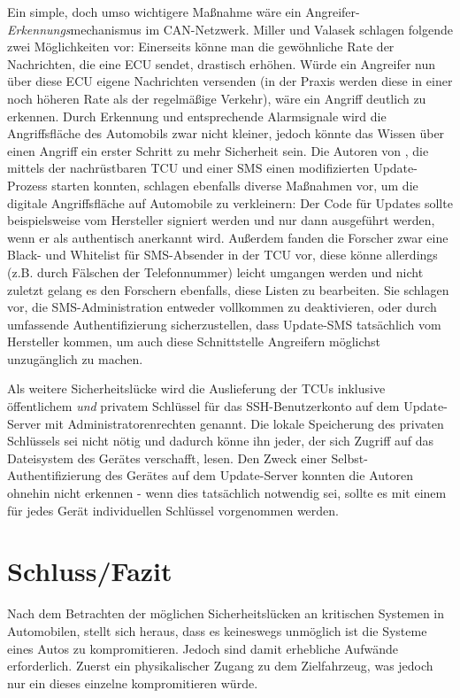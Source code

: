 \documentclass[
    fontsize=12pt,
    headings=small,
    parskip=half,           %
    bibliography=totoc,9
    numbers=noenddot,       %
    open=any,               %
    ]{scrreprt}
\begin{document}
Ein simple, doch umso wichtigere Maßnahme wäre ein Angreifer-\textit{Erkennungs}mechanismus im CAN-Netzwerk. Miller und Valasek schlagen folgende zwei Möglichkeiten vor: Einerseits könne man die gewöhnliche Rate der Nachrichten, die eine ECU sendet, drastisch erhöhen. Würde ein Angreifer nun über diese ECU eigene Nachrichten versenden (in der Praxis werden diese in einer noch höheren Rate als der regelmäßige Verkehr), wäre ein Angriff deutlich zu erkennen. Durch Erkennung und entsprechende Alarmsignale wird die Angriffsfläche des Automobils zwar nicht kleiner, jedoch könnte das Wissen über einen Angriff ein erster Schritt zu mehr Sicherheit sein.
Die Autoren von \cite{FPK15}, die mittels der nachrüstbaren TCU und einer SMS einen modifizierten Update-Prozess starten konnten, schlagen ebenfalls diverse Maßnahmen vor, um die digitale Angriffsfläche auf Automobile zu verkleinern: Der Code für Updates sollte beispielsweise vom Hersteller signiert werden und nur dann ausgeführt werden, wenn er als authentisch anerkannt wird. Außerdem fanden die Forscher zwar eine Black- und Whitelist für SMS-Absender in der TCU vor, diese könne allerdings (z.B. durch Fälschen der Telefonnummer) leicht umgangen werden und nicht zuletzt gelang es den Forschern ebenfalls, diese Listen zu bearbeiten. Sie schlagen vor, die SMS-Administration entweder vollkommen zu deaktivieren, oder durch umfassende Authentifizierung sicherzustellen, dass Update-SMS tatsächlich vom Hersteller kommen, um auch diese Schnittstelle Angreifern möglichst unzugänglich zu machen.\par
Als weitere Sicherheitslücke wird die Auslieferung der TCUs inklusive öffentlichem \textit{und} privatem Schlüssel für das SSH-Benutzerkonto auf dem Update-Server mit Administratorenrechten genannt. Die lokale Speicherung des privaten Schlüssels sei nicht nötig und dadurch könne ihn jeder, der sich Zugriff auf das Dateisystem des Gerätes verschafft, lesen. Den Zweck einer Selbst-Authentifizierung des Gerätes auf dem Update-Server konnten die Autoren ohnehin nicht erkennen - wenn dies tatsächlich notwendig sei, sollte es mit einem für jedes Gerät individuellen Schlüssel vorgenommen werden.

\chapter{Schluss/Fazit}

Nach dem Betrachten der möglichen Sicherheitslücken an kritischen Systemen in Automobilen, stellt sich heraus, dass es keineswegs unmöglich ist die Systeme eines Autos zu kompromitieren. Jedoch sind damit erhebliche Aufwände erforderlich. Zuerst ein physikalischer Zugang zu dem Zielfahrzeug, was jedoch nur ein dieses einzelne kompromitieren würde.
\end{document}
